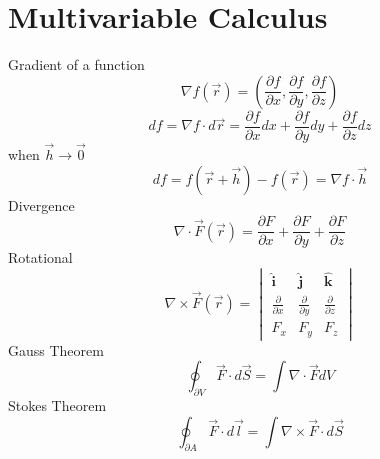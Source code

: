 \documentclass{article}
\newcommand{\uvec}[1]{\boldsymbol{\hat{\textbf{#1}}}}
\begin{document}
\section{Multivariable Calculus}
Gradient of a function
\begin{equation}
  \nabla f(\vec{r}) = (\frac{\partial f}{\partial x},\frac{\partial f}{\partial y},\frac{\partial f}{\partial z})
\end{equation}
\begin{equation}
  df = \nabla f \cdot d\vec{r} = \frac{\partial f}{\partial x} dx + \frac{\partial f}{\partial y} dy + \frac{\partial f}{\partial z} dz 
\end{equation}
when $\vec{h} \to \vec{0}$
\begin{equation}
  df = f(\vec{r} + \vec{h}) - f(\vec{r}) =  \nabla f \cdot \vec{h} 
\end{equation}
Divergence
\begin{equation}
  \nabla \cdot \vec{F}(\vec{r}) = \frac{\partial F}{\partial x} +  \frac{\partial F}{\partial y} +  \frac{\partial F}{\partial z}
\end{equation}
Rotational
\begin{equation}
  \nabla \times \vec{F}(\vec{r}) =
  \begin{vmatrix}
    \uvec{i} & \uvec{j} & \uvec{k} \\
    \frac{\partial}{\partial x} & \frac{\partial}{\partial y} & \frac{\partial}{\partial z}\\
    F_x & F_y & F_z
  \end{vmatrix}
\end{equation}
Gauss Theorem
\begin{equation}
  \oint_{\partial V} \vec{F} \cdot d\vec{S} = \int \nabla \cdot \vec{F} dV 
\end{equation}
Stokes Theorem
\begin{equation}
  \oint_{\partial A} \vec{F} \cdot d\vec{l} = \int \nabla \times \vec{F} \cdot d\vec{S}
\end{equation}
\end{document}
